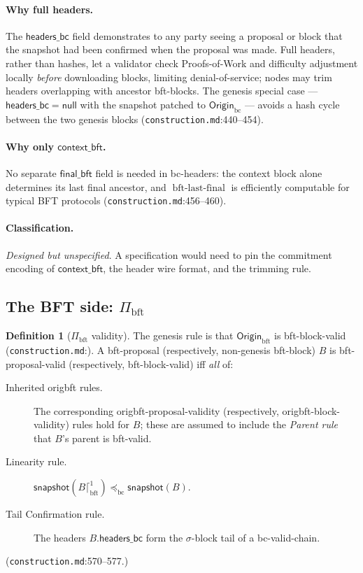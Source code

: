 \documentclass[11pt,a4paper]{article}
\theoremstyle{definition}
\newtheorem{definition}[theorem]{Definition}
\begin{document}
\paragraph{Why full headers.} The $\mathsf{headers\_bc}$ field
demonstrates to any party seeing a proposal or block that the snapshot had
been confirmed when the proposal was made. Full headers, rather than
hashes, let a validator check Proofs-of-Work and difficulty adjustment
locally \emph{before} downloading blocks, limiting denial-of-service;
nodes may trim headers overlapping with ancestor bft-blocks. The genesis
special case --- $\mathsf{headers\_bc} = \mathsf{null}$ with the snapshot
patched to $\mathsf{Origin}_{\mathrm{bc}}$ --- avoids a hash cycle between
the two genesis blocks (\texttt{construction.md}:440--454).

\paragraph{Why only $\mathsf{context\_bft}$.} No separate
$\mathsf{final\_bft}$ field is needed in bc-headers: the context block
alone determines its last final ancestor, and
$\operatorname{bft\text{-}last\text{-}final}$ is efficiently computable
for typical BFT protocols (\texttt{construction.md}:456--460).

\paragraph{Classification.} \emph{Designed but unspecified}. A
specification would need to pin the commitment encoding of
$\mathsf{context\_bft}$, the header wire format, and the trimming rule.

\subsection{The BFT side:
\texorpdfstring{$\Pi_{\mathrm{bft}}$}{Pi-bft}}\label{sec:xl-bft}

\begin{definition}[$\Pi_{\mathrm{bft}}$ validity]\label{def:xl-bft-validity}
The genesis rule is that $\mathsf{Origin}_{\mathrm{bft}}$ is
bft-block-valid (\texttt{construction\allowbreak .md}:).
A bft-proposal
(respectively, non-genesis bft-block) $B$ is bft-proposal-valid
(respectively, bft-block-valid) iff \emph{all} of:
\begin{description}
\item[Inherited origbft rules.] The corresponding
  origbft-proposal-validity (respectively, origbft-block-validity) rules
  hold for $B$; these are assumed to include the \emph{Parent rule} that
  $B$'s parent is bft-valid.
\item[Linearity rule.] $\mathsf{snapshot}(B \lceil^{1}_{\mathrm{bft}})
  \preceq_{\mathrm{bc}} \mathsf{snapshot}(B)$.
\item[Tail Confirmation rule.] The headers $B.\mathsf{headers\_bc}$ form
  the $\sigma$-block tail of a bc-valid-chain.
\end{description}
(\texttt{construction.md}:570--577.)
\end{definition}
\end{document}
